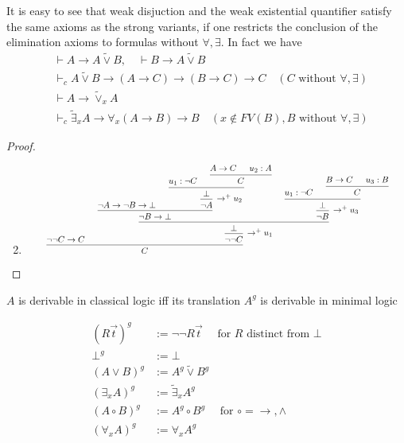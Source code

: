 \documentclass[11pt]{article}
\def \texists {\tilde{\exists}}
\def \tvee {\tilde{\vee}}
\begin{document}
\begin{remark}
It is easy to see that weak disjuction and the weak existential quantifier
satisfy the same axioms as the strong variants, if one restricts the
conclusion of the elimination axioms to formulas without \(\forall,
   \exists\). In fact we have
\begin{align*}
& \vdash A\to A\tvee B,\quad\vdash B\to A\tvee B\\
&\vdash_c A\tvee B\to(A\to C)\to(B\to C)\to C\quad(C\text{ without }\forall,\exists)\\
&\vdash A\to\tvee_xA\\
&\vdash_c \texists_xA\to\forall_x(A\to B)\to B\quad(x\not\in FV(B),B\text{ without }\forall,\exists)
\end{align*}
\end{remark}

\begin{proof}
\begin{enumerate}
\setcounter{enumi}{1}
\item \begin{equation*}
\resizebox{0.9\textwidth}{!}{
\begin{prooftree}[center=false]
\hypo{\neg\neg C\to C}
\hypo{\neg A\to\neg B\to\bot}
\hypo{u_1:\neg C}
\hypo{A\to C}
\hypo{u_2:A}
\infer2{C}
\infer2{\bot}
\infer1[\(\to^+u_2\)]{\neg A}
\infer2{\neg B\to\bot}
\hypo{u_1:\neg C}
\hypo{B\to C}
\hypo{u_3:B}
\infer2{C}
\infer2{\bot}
\infer1[\(\to^+u_3\)]{\neg B}
\infer2{\bot}
\infer1[\(\to^+u_1\)]{\neg\neg C}
\infer2{C}
\end{prooftree}}
\end{equation*}
\end{enumerate}
\end{proof}

\(A\) is derivable in classical logic iff its translation \(A^g\) is
derivable in minimal logic

\begin{definition}
\begin{align*}
(R\vec{t})^g&:=\neg\neg R\vec{t}\quad\text{ for }R\text{ distinct from }\bot\\
\bot^g&:=\bot\\
(A\vee B)^g&:=A^g\tvee B^g\\
(\exists_xA)^g&:=\texists_xA^g\\
(A\circ B)^g&:=A^g\circ B^g\quad\text{ for }\circ=\to,\wedge\\
(\forall_xA)^g&:=\forall_xA^g
\end{align*}
\end{definition}
\end{document}
